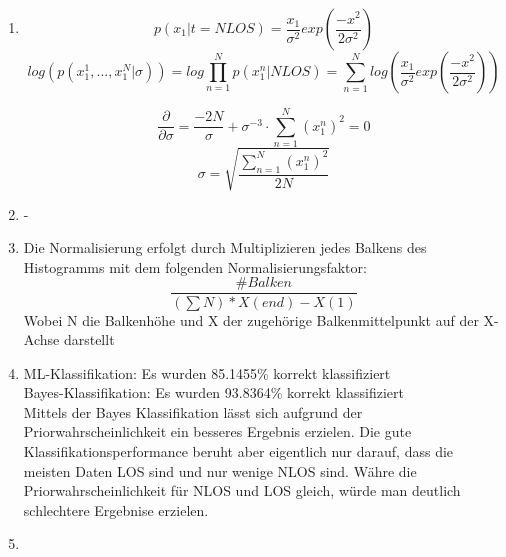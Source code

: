 \begin{enumerate}
 \item 

\begin{equation}
 p(x_1|t=NLOS) = \frac{x_1}{\sigma^2} exp(\frac{-x^2}{2\sigma^2})
\end{equation}
\begin{equation}
 log(p(x_1^1, ..., x_1^N| \sigma)) = log \prod_{n=1}^N p(x_1^n|NLOS) = \sum_{n=1}^N log(\frac{x_1}{\sigma^2} exp(\frac{-x^2}{2\sigma^2}))
\end{equation}

\begin{equation}
\frac{\partial}{\partial \sigma} = \frac{-2N}{\sigma} + \sigma^{-3} \cdot \sum_{n=1}^N (x_1^n)^2 = 0
\end{equation}
\begin{equation}
 \sigma = \sqrt{\frac{\sum_{n=1}^N (x_1^n)^2}{2N}}
\end{equation}


\item -
\item Die Normalisierung erfolgt durch Multiplizieren jedes Balkens des Histogramms mit dem folgenden Normalisierungsfaktor:
\begin{equation}
 \frac{\#Balken}{(\sum N) * X(end) - X(1)}
\end{equation}
Wobei N die Balkenhöhe und X der zugehörige Balkenmittelpunkt auf der X-Achse darstellt
\item 
ML-Klassifikation: Es wurden 85.1455\% korrekt klassifiziert \\
Bayes-Klassifikation: Es wurden 93.8364\% korrekt klassifiziert \\
Mittels der Bayes Klassifikation lässt sich aufgrund der Priorwahrscheinlichkeit ein besseres Ergebnis erzielen.
Die gute Klassifikationsperformance beruht aber eigentlich nur darauf, dass die meisten Daten LOS sind und nur
wenige NLOS sind. Währe die Priorwahrscheinlichkeit für NLOS und LOS gleich, würde man deutlich schlechtere Ergebnise
erzielen.
\item




\end{enumerate}

